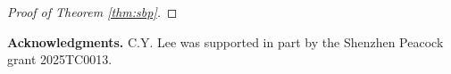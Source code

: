 \documentclass[reqno]{amsart}
\DeclareMathOperator{\Var}{Var}
\newcommand{\R}{\mathbb R}
\newcommand{\E}{\mathbb E}
\renewcommand{\P}{\mathbb P}
\newcommand{\1}{\mathbf 1}
\numberwithin{equation}{section}
\theoremstyle{definition}
\begin{document}
\begin{proof}[Proof of Theorem \ref{thm:sbp}]
%
\end{proof}

{\bf Acknowledgments.}
C.Y. Lee was supported in part by the Shenzhen Peacock grant
2025TC0013.

\end{document}
